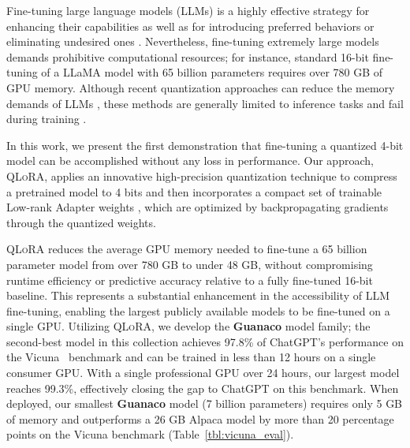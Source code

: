 Fine-tuning large language models (LLMs) is a highly effective strategy for enhancing their capabilities \citep{min2021metaicl, wei2021finetuned, ouyang2022training, wang2022super, wang2022self, liu2022few} as well as for introducing preferred behaviors or eliminating undesired ones \citep{ouyang2022training,askell2021general,bai2022training}. Nevertheless, fine-tuning extremely large models demands prohibitive computational resources; for instance, standard 16-bit fine-tuning of a LLaMA model with 65 billion parameters \citep{touvron2023llama} requires over 780 GB of GPU memory. Although recent quantization approaches can reduce the memory demands of LLMs \citep{dettmers2022llm, dettmers2022case, frantar2022gptq, xiao2022smoothquant}, these methods are generally limited to inference tasks and fail during training \citep{wortsman2023stable}.

In this work, we present the first demonstration that fine-tuning a quantized 4-bit model can be accomplished without any loss in performance. Our approach, \textsc{QLoRA}, applies an innovative high-precision quantization technique to compress a pretrained model to 4 bits and then incorporates a compact set of trainable Low-rank Adapter weights \citep{hu2021lora}, which are optimized by backpropagating gradients through the quantized weights.

\textsc{QLoRA} reduces the average GPU memory needed to fine-tune a 65 billion parameter model from over 780 GB to under 48 GB, without compromising runtime efficiency or predictive accuracy relative to a fully fine-tuned 16-bit baseline. This represents a substantial enhancement in the accessibility of LLM fine-tuning, enabling the largest publicly available models to be fine-tuned on a single GPU. Utilizing \textsc{QLoRA}, we develop the \textbf{Guanaco} model family; the second-best model in this collection achieves 97.8\% of ChatGPT's performance on the Vicuna~\citep{vicuna2023} benchmark and can be trained in less than 12 hours on a single consumer GPU. With a single professional GPU over 24 hours, our largest model reaches 99.3\%, effectively closing the gap to ChatGPT on this benchmark. When deployed, our smallest \textbf{Guanaco} model (7 billion parameters) requires only 5 GB of memory and outperforms a 26 GB Alpaca model by more than 20 percentage points on the Vicuna benchmark (Table~\ref{tbl:vicuna_eval}).


